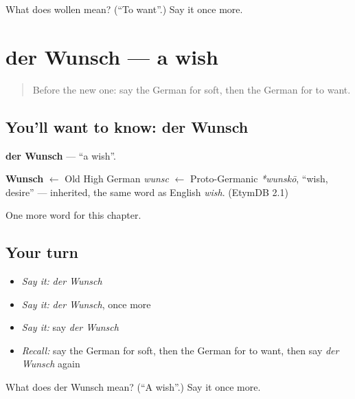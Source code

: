 \begin{tcolorbox}[breakable,colback=teal!4,colframe=teal!35!black,title={Before you move on}]
What does wollen mean? (\textquotedblleft{}To want\textquotedblright{}.) Say it once more.
\end{tcolorbox}
\section[der Wunsch]{der Wunsch — a wish}

\label{lesson:GE-C136-wunsch}



\begin{quote}
Before the new one: say the German for soft, then the German for to want.
\end{quote}

\subsection*{You'll want to know: der Wunsch}
\textbf{der Wunsch} — \textquotedblleft{}a wish\textquotedblright{}.

\begin{cousinweb}
\textbf{Wunsch} $\leftarrow$ Old High German \emph{wunsc} $\leftarrow$ Proto-Germanic \emph{*wunskō}, \textquotedblleft{}wish, desire\textquotedblright{} — inherited, the same word as English \emph{wish}. (EtymDB 2.1)
\end{cousinweb}

\begin{grammarlens}[title={What you've built}]
One more word for this chapter.
\end{grammarlens}

\subsection*{Your turn}
\begin{itemize}
\raggedright
  \item \emph{Say it:} \emph{der Wunsch}
  \item \emph{Say it:} \emph{der Wunsch}, once more
  \item \emph{Say it:} say \emph{der Wunsch}
  \item \emph{Recall:} say the German for soft, then the German for to want, then say \emph{der Wunsch} again
\end{itemize}

\begin{tcolorbox}[breakable,colback=teal!4,colframe=teal!35!black,title={Before you move on}]
What does der Wunsch mean? (\textquotedblleft{}A wish\textquotedblright{}.) Say it once more.
\end{tcolorbox}

